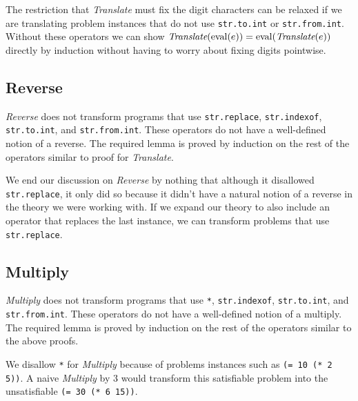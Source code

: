 The restriction that \textit{Translate} must fix the digit characters can be
relaxed if we are translating problem instances that do not use
\texttt{str.to.int} or \texttt{str.from.int}. Without these operators we can
show $\textit{Translate}(\operatorname{eval} (e)) = \operatorname{eval} (\textit{Translate}(e))$ directly by
induction without having to worry about fixing digits pointwise.

\subsection{Reverse}
\textit{Reverse} does not transform programs that use \texttt{str.replace},
\texttt{str.indexof}, \texttt{str.to.int}, and \texttt{str.from.int}. These
operators do not have a well-defined notion of a reverse. The required lemma is
proved by induction on the rest of the operators similar to proof for
\textit{Translate}.

We end our discussion on \textit{Reverse} by nothing that although it disallowed
\texttt{str.replace}, it only did so because it didn't have a natural notion of
a reverse in the theory we were working with. If we expand our theory to also
include an operator that replaces the last instance, we can transform problems
that use \texttt{str.replace}.

\subsection{Multiply}
\textit{Multiply} does not transform programs that use \texttt{*},
\texttt{str.indexof}, \texttt{str.to.int}, and \texttt{str.from.int}. These
operators do not have a well-defined notion of a multiply. The required lemma is
proved by induction on the rest of the operators similar to the above proofs.

We disallow \texttt{*} for \textit{Multiply} because of problems instances such
as \texttt{(= 10 (* 2 5))}. A naive \textit{Multiply} by $3$ would transform
this satisfiable problem into the unsatisfiable \texttt{(= 30 (* 6 15))}.
